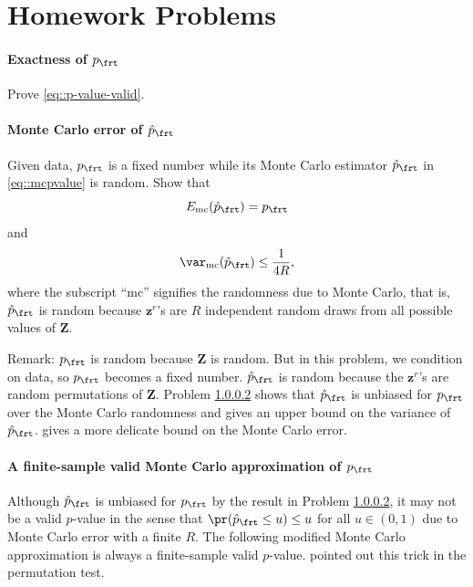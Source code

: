 \section{Homework Problems}



\paragraph{Exactness of $p_\frt$}
\label{hw::exact-frt}

Prove \eqref{eq::p-value-valid}. 



\paragraph{Monte Carlo error of $\hat p_\frt$ }\label{para::monte-carlo-error-pfrt}

Given data, $p_\frt$ is a fixed number while its Monte Carlo estimator $\hat p_\frt$ in \eqref{eq::mcpvalue} is random. 
Show that
$$
E_{\text{mc}} (\hat p_\frt) =   p_\frt
$$
and
$$
\var_{\text{mc}} (\hat p_\frt)  \leq \frac{1}{4R},
$$
where the subscript ``mc'' signifies the randomness due to Monte Carlo, that is, $\hat p_\frt$ is random because $\bm{z}^r$'s are $R$ independent random draws from all possible values of $\bm{Z}$.


Remark: $p_\frt$ is random because $\bm{Z}$ is random. But in this problem, we condition on data, so $p_\frt$ becomes a fixed number. $\hat p_\frt$ is random because the $\bm{z}^r$'s are random permutations of $\bm{Z}$.
Problem \ref{para::monte-carlo-error-pfrt} shows that $\hat p_\frt$ is unbiased for $p_\frt$ over the Monte Carlo randomness and gives an upper bound on the variance of $\hat p_\frt$. \citet[][Theorem 2]{luo2021leveraging} gives a more delicate bound on the Monte Carlo error.




\paragraph{A finite-sample valid Monte Carlo approximation of $p_\frt$ }\label{para::finite-sample-exact-monte-carlo-frt}


Although $\hat p_\frt$ is unbiased for $p_\frt$ by the result in Problem \ref{para::monte-carlo-error-pfrt}, it may not be a valid $p$-value in the sense that $\pr(\hat p_\frt \leq u) \leq u$ for all $u\in (0,1)$ due to Monte Carlo error with a finite $R$. The following modified Monte Carlo approximation is always a finite-sample valid $p$-value. \citet{phipson2010permutation} pointed out this trick in the permutation test.



